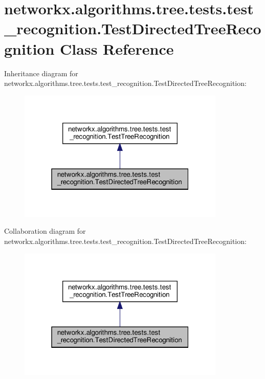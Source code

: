 \hypertarget{classnetworkx_1_1algorithms_1_1tree_1_1tests_1_1test__recognition_1_1TestDirectedTreeRecognition}{}\section{networkx.\+algorithms.\+tree.\+tests.\+test\+\_\+recognition.\+Test\+Directed\+Tree\+Recognition Class Reference}
\label{classnetworkx_1_1algorithms_1_1tree_1_1tests_1_1test__recognition_1_1TestDirectedTreeRecognition}


Inheritance diagram for networkx.\+algorithms.\+tree.\+tests.\+test\+\_\+recognition.\+Test\+Directed\+Tree\+Recognition\+:
\nopagebreak
\begin{figure}[H]
\begin{center}
\leavevmode
\includegraphics[width=280pt]{classnetworkx_1_1algorithms_1_1tree_1_1tests_1_1test__recognition_1_1TestDirectedTreeRecognition__inherit__graph}
\end{center}
\end{figure}


Collaboration diagram for networkx.\+algorithms.\+tree.\+tests.\+test\+\_\+recognition.\+Test\+Directed\+Tree\+Recognition\+:
\nopagebreak
\begin{figure}[H]
\begin{center}
\leavevmode
\includegraphics[width=280pt]{classnetworkx_1_1algorithms_1_1tree_1_1tests_1_1test__recognition_1_1TestDirectedTreeRecognition__coll__graph}
\end{center}
\end{figure}
